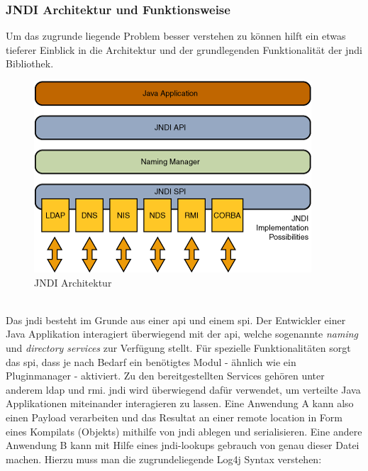 \subsubsection{JNDI Architektur und Funktionsweise}

Um das zugrunde liegende Problem besser verstehen zu können hilft ein etwas tieferer Einblick in die Architektur
und der grundlegenden Funktionalität der \gls{jndi} Bibliothek.
\begin{figure}[!htb] %
    \begin{center}
        \includegraphics[scale=0.75]{images/jndiarch}
    \end{center}
    \caption{JNDI Architektur}
\end{figure}
\\
Das \gls{jndi} besteht im Grunde aus einer \gls{api} und einem \gls{spi}. Der Entwickler einer Java Applikation interagiert überwiegend mit der \gls{api}, welche sogenannte
\textit{naming} und \textit{directory services} zur Verfügung stellt. Für spezielle Funktionalitäten sorgt das \gls{spi}, dass je nach Bedarf ein benötigtes Modul - ähnlich wie ein Pluginmanager
 - aktiviert. Zu den bereitgestellten Services gehören unter anderem \gls{ldap} und \gls{rmi}. \gls{jndi} wird
überwiegend dafür verwendet, um verteilte Java Applikationen miteinander interagieren zu lassen. Eine Anwendung A kann also einen Payload verarbeiten und
das Resultat an einer remote location in Form eines Kompilats (Objekts) mithilfe von \gls{jndi} ablegen und serialisieren. Eine andere Anwendung B kann mit Hilfe eines \gls{jndi}-lookups gebrauch von genau
dieser Datei machen.
Hierzu muss man die zugrundeliegende Log4j Syntax verstehen:

\vspace{0.3cm}


